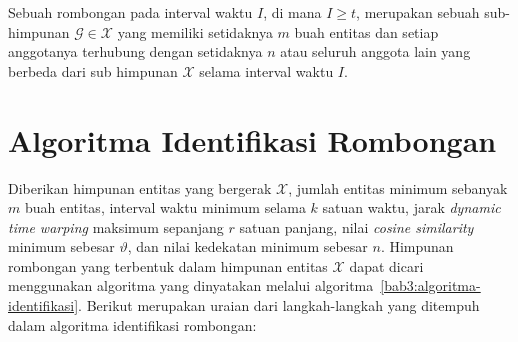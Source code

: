 Sebuah rombongan pada interval waktu $I$, di mana $I \geq t$, merupakan sebuah sub-himpunan $\mathcal{G} \in \mathcal{X}$ yang memiliki setidaknya $m$ buah entitas dan setiap anggotanya terhubung dengan setidaknya $n$ atau seluruh anggota lain yang berbeda dari sub himpunan $\mathcal{X}$ selama interval waktu $I$.

\section{Algoritma Identifikasi Rombongan}
\label{sec:algoritma}
    
Diberikan himpunan entitas yang bergerak $\mathcal{X}$, jumlah entitas minimum sebanyak $m$ buah entitas, interval waktu minimum selama $k$ satuan waktu, jarak \textit{dynamic time warping} maksimum sepanjang $r$ satuan panjang, nilai \textit{cosine similarity} minimum sebesar $\vartheta$, dan nilai kedekatan minimum sebesar $n$. Himpunan rombongan yang terbentuk dalam himpunan entitas $\mathcal{X}$ dapat dicari menggunakan algoritma yang dinyatakan melalui algoritma~\ref{bab3:algoritma-identifikasi}. Berikut merupakan uraian dari langkah-langkah yang ditempuh dalam algoritma identifikasi rombongan:

